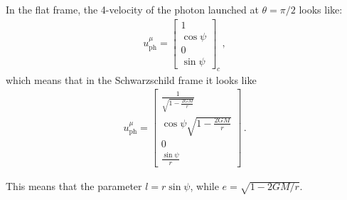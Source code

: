 \documentclass[main.tex]{subfiles}
\begin{document}
In the flat frame, the 4-velocity of the photon launched at \(\theta = \pi /2\) looks like: 
%
\begin{subequations}
\begin{align}
  u^{\mu } _{\text{ph}} = \left[\begin{array}{c}
  1 \\ 
  \cos \psi  \\ 
  0 \\ 
  \sin \psi 
  \end{array}\right]_c
\,,
\end{align}
\end{subequations}
%
which means that in the Schwarzschild frame it looks like 
%
\begin{subequations}
\begin{align}
  u^{\mu }_{\text{ph}} = \left[\begin{array}{c}
  \frac{1}{\sqrt{1-\frac{2GM}{r}}} \\ 
  \cos \psi \sqrt{1 - \frac{2GM}{r}} \\ 
  0 \\ 
  \frac{\sin \psi}{r} 
  \end{array}\right]
\,.
\end{align}
\end{subequations}

This means that the parameter \(l = r \sin \psi \), while \(e = \sqrt{1-2GM/r}\). 
\end{document}
